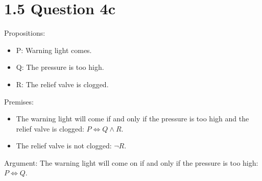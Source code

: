 \documentclass[12pt]{article}
\begin{document}
	\section{1.5 Question 4c}
	
	Propositions:
	\begin{itemize}
		\item P: Warning light comes.
		\item Q: The pressure is too high.
		\item R: The relief valve is clogged.
	\end{itemize}

	Premises:
	\begin{itemize}
		\item The warning light will come if and only if the pressure is too high and the relief valve is clogged: $P \iff Q \land R$.
		\item The relief valve is not clogged: $\lnot R$.
	\end{itemize}

	Argument: The warning light will come on if and only if the pressure is too high: $P \iff Q$.
	
\end{document}
